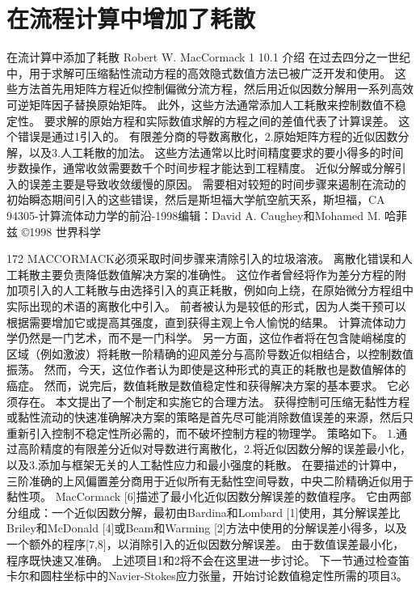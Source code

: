 \documentclass[UTF8,11pt,a4paper,openany,fontset=fandol]{ctexbook}
\begin{document}
\clearpage
\chapter{在流程计算中增加了耗散}
在流计算中添加了耗散 Robert W. MacCormack 1 10.1 介绍 在过去四分之一世纪中，用于求解可压缩黏性流动方程的高效隐式数值方法已被广泛开发和使用。 这些方法首先用矩阵方程近似控制偏微分流方程，然后用近似因数分解用一系列高效可逆矩阵因子替换原始矩阵。 此外，这些方法通常添加人工耗散来控制数值不稳定性。 要求解的原始方程和实际数值求解的方程之间的差值代表了计算误差。 这个错误是通过1引入的。 有限差分商的导数离散化，2.原始矩阵方程的近似因数分解，以及3.人工耗散的加法。 这些方法通常以比时间精度要求的要小得多的时间步数操作，通常收敛需要数千个时间步程才能达到工程精度。 近似分解或分解引入的误差主要是导致收敛缓慢的原因。 需要相对较短的时间步骤来遏制在流动的初始瞬态期间引入的这些错误，然后是斯坦福大学航空航天系，斯坦福，CA 94305-计算流体动力学的前沿-1998编辑：David A. Caughey和Mohamed M. 哈菲兹 ©1998 世界科学

172 MACCORMACK必须采取时间步骤来清除引入的垃圾溶液。 离散化错误和人工耗散主要负责降低数值解决方案的准确性。 这位作者曾经将作为差分方程的附加项引入的人工耗散与由选择引入的真正耗散，例如向上绕，在原始微分方程组中实际出现的术语的离散化中引入。 前者被认为是较低的形式，因为人类干预可以根据需要增加它或提高其强度，直到获得主观上令人愉悦的结果。 计算流体动力学仍然是一门艺术，而不是一门科学。 另一方面，这位作者将在包含陡峭梯度的区域（例如激波）将耗散一阶精确的迎风差分与高阶导数近似相结合，以控制数值振荡。 然而，今天，这位作者认为即使是这种形式的真正的耗散也是数值解体的癌症。 然而，说完后，数值耗散是数值稳定性和获得解决方案的基本要求。 它必须存在。 本文提出了一个制定和实施它的合理方法。 获得控制可压缩无黏性方程或黏性流动的快速准确解决方案的策略是首先尽可能消除数值误差的来源，然后只重新引入控制不稳定性所必需的，而不破坏控制方程的物理学。 策略如下。 1.通过高阶精度的有限差分近似对导数进行离散化，2.将近似因数分解的误差最小化，以及3.添加与框架无关的人工黏性应力和最小强度的耗散。 在要描述的计算中，三阶准确的上风偏置差分商用于近似所有无黏性空间导数，中央二阶精确近似用于黏性项。 MacCormack [6]描述了最小化近似因数分解误差的数值程序。 它由两部分组成：一个近似因数分解，最初由Bardina和Lombard [1]使用，其分解误差比Briley和McDonald [4]或Beam和Warming [2]方法中使用的分解误差小得多，以及一个额外的程序[7,8]，以消除引入的近似因数分解误差。 由于数值误差最小化，程序既快速又准确。 上述项目1和2将不会在这里进一步讨论。 下一节通过检查笛卡尔和圆柱坐标中的Navier-Stokes应力张量，开始讨论数值稳定性所需的项目3。
\end{document}

